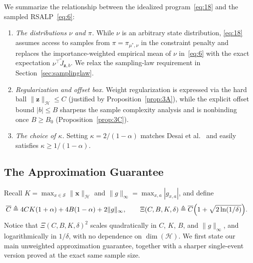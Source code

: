 \documentclass[11pt,letterpaper]{article}
\newcommand{\Cbar}{\overline{C}}
\newcommand{\occ}{\pi_{\mu^*,\nu}}
\newcommand{\norm}[1]{\lVert #1\rVert}
\newcommand{\defeq}{\triangleq}
\theoremstyle{definition}
\begin{document}
We summarize the relationship between the idealized program~\eqref{eq:18} and the sampled RSALP~\eqref{eq:6}:
\begin{enumerate}[leftmargin=2em,itemsep=2pt]
  \item \emph{The distributions $\nu$ and $\pi$.} While $\nu$ is an arbitrary state distribution, \eqref{eq:18} assumes access to samples from $\pi = \occ$ in the constraint penalty and replaces the importance-weighted empirical mean of $\nu$ in~\eqref{eq:6} with the exact expectation $\nu^\top \tilde{J}_{\mathbf{z},b}$. We relax the sampling-law requirement in Section~\ref{sec:samplinglaw}.
  \item \emph{Regularization and offset box.} Weight regularization is expressed via the hard ball $\norm{\mathbf{z}}_{\mathcal{H}} \le C$ (justified by Proposition~\ref{prop:3A}), while the explicit offset bound $|b| \le B$ sharpens the sample complexity analysis and is nonbinding once $B \ge B_0$ (Proposition~\ref{prop:3C}).
  \item \emph{The choice of $\kappa$.} Setting $\kappa = 2/(1-\alpha)$ matches Desai et al.~\cite{DesaiFariasMoallemi12} and easily satisfies $\kappa \ge 1/(1-\alpha)$.
\end{enumerate}

\subsection{The Approximation Guarantee}
\label{sec:approx_guarantee}

Recall $K = \max_{x\in\mathcal{S}}\norm{\mathbf{x}}_{\mathcal{H}}$ and $\norm{g}_\infty = \max_{x,a}|g_{x,a}|$, and define
\[
 \Cbar \defeq 4CK(1+\alpha) + 4B(1-\alpha) + 2\norm{g}_\infty, \qquad
 \Xi(C,B,K,\delta) \defeq \Cbar\Bigl(1 + \sqrt{2\ln(1/\delta)}\Bigr).
\]
Notice that $\Xi(C,B,K,\delta)^2$ scales quadratically in $C$, $K$, $B$, and $\norm{g}_\infty$, and logarithmically in $1/\delta$, with no dependence on $\dim(\mathcal{H})$. We first state our main unweighted approximation guarantee, together with a sharper single-event version proved at the exact same sample size.
\end{document}
